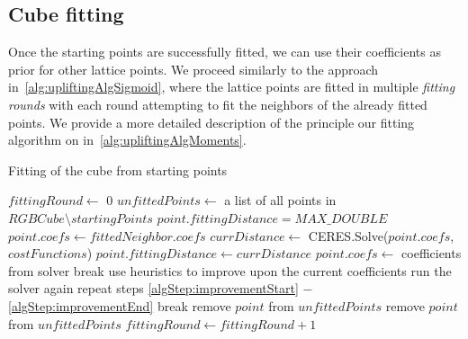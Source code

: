 \subsection{Cube fitting}
Once the starting points are successfully fitted, we can use their coefficients as prior for other lattice points. We proceed similarly to the approach in~\cref{alg:upliftingAlgSigmoid}, where the lattice points are fitted in multiple \emph{fitting rounds} with each round attempting to fit the neighbors of the already fitted points. We provide a more detailed description of the principle our fitting algorithm on in~\cref{alg:upliftingAlgMoments}.

\begin{algorithm}[t!]
	\caption{Fitting of the cube from starting points}
	\label{alg:upliftingAlgMoments}
	\begin{algorithmic}[1]
		\State $fittingRound \gets$ $0$
		\State $unfittedPoints \gets$ a list of all points in $RGBCube \setminus startingPoints$
		\State $point.fittingDistance = MAX\_DOUBLE$
		\EndFor
		\State $point.coefs \gets fittedNeighbor.coefs$
		\State $currDistance \gets $ CERES.Solve($point.coefs$, $costFunctions$)
		 \label{algStep:improvementStart}
		\State $point.fittingDistance \gets currDistance$
		\State $point.coefs \gets $ coefficients from solver
		\EndIf
		\State break
		\EndIf \label{algStep:improvementEnd}
		\EndFor
		 \label{algStep:heuristicsStart}
		\State use heuristics to improve upon the current coefficients
		\State run the solver again
		\State repeat steps \ref{algStep:improvementStart} $-$ \ref{algStep:improvementEnd}
		\State break \label{algStep:heuristicsEnd}
		\EndIf
		\EndWhile
		\State remove $point$ from $unfittedPoints$
		\EndIf
		\State remove $point$ from $unfittedPoints$
		\EndIf
		\EndFor	
		\State $fittingRound \gets fittingRound+1$
		\EndWhile
	\end{algorithmic}
\end{algorithm}

